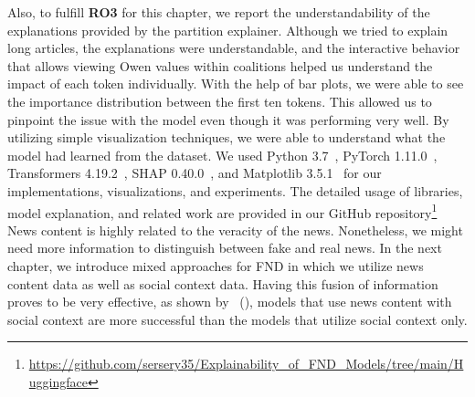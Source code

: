 Also, to fulfill \textbf{RO3} for this chapter, we report the understandability of the explanations provided by the partition explainer. Although we tried to explain long articles, the explanations were understandable, and the interactive behavior that allows viewing Owen values within coalitions helped us understand the impact of each token individually. With the help of bar plots, we were able to see the importance distribution between the first ten tokens. This allowed us to pinpoint the issue with the model even though it was performing very well. By utilizing simple visualization techniques, we were able to understand what the model had learned from the dataset. We used Python 3.7~\parencite{Python_Rossum}, PyTorch 1.11.0~\parencite{PyTorch_Paszke}, Transformers 4.19.2~\parencite{Transformers_Wolf}, SHAP 0.40.0~\parencite{AUnifiedApproach_Lundberg}, and Matplotlib 3.5.1~\parencite{Matplotlib_Hunter} for our implementations, visualizations, and experiments. The detailed usage of libraries, model explanation, and related work are provided in our GitHub repository\footnote{\url{https://github.com/sersery35/Explainability_of_FND_Models/tree/main/Huggingface}} \\
News content is highly related to the veracity of the news. Nonetheless, we might need more information to distinguish between fake and real news. In the next chapter, we introduce mixed approaches for FND in which we utilize news content data as well as social context data. Having this fusion of information proves to be very effective, as shown by~\citeauthor{UPFD_Dataset_Shu} (\citeyear{UPFD_Dataset_Shu}), models that use news content with social context are more successful than the models that utilize social context only.\\